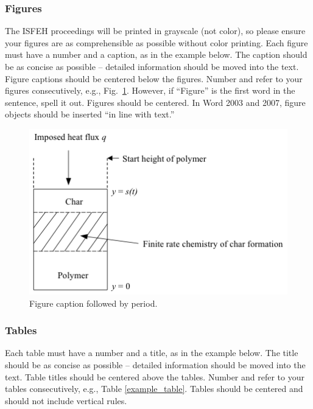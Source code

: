 \documentclass[fleqn,b5paper,10pt]{article}
\begin{document}
\subsubsection*{Figures}

The ISFEH proceedings will be printed in grayscale (not color), so please ensure your figures are as comprehensible as possible without color printing. Each figure must have a number and a caption, as in the example below. The caption should be as concise as possible -- detailed information should be moved into the text. Figure captions should be centered below the figures. Number and refer to your figures consecutively, e.g., Fig.~\ref{fig_pyrolysis_model}. However, if ``Figure'' is the first word in the sentence, spell it out. Figures should be centered. In Word 2003 and 2007, figure objects should be inserted ``in line with text.''
\begin{figure}[h!]
\centering
\includegraphics[width=.5\linewidth]{isfeh_fig1.png}
\caption{Figure caption followed by period.}
\label{fig_pyrolysis_model}
\end{figure}

\subsubsection*{Tables}

Each table must have a number and a title, as in the example below. The title should be as concise as possible -- detailed information should be moved into the text. Table titles should be centered above the tables. Number and refer to your tables consecutively, e.g., Table \ref{example_table}. Tables should be centered and should not include vertical rules.
\end{document}
